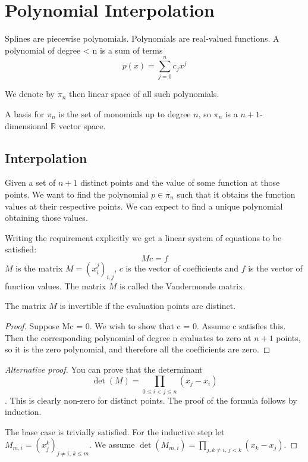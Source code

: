 
\chapter{Polynomial Interpolation}

Splines are piecewise polynomials.
Polynomials are real-valued functions.
A polynomial of degree < n is a sum of terms
\begin{equation*}
p(x) = \sum_{j=0}^n c_j x^j
\end{equation*}

We denote by $\pi_n$ then linear space of all such polynomials.

A basis for $\pi_n$ is the set of monomials up to degree $n$, so $\pi_n$ is a $n + 1$-dimensional $\mathbb R$ vector space.

\section{Interpolation}

Given a set of $n + 1$ distinct points and the value of some function at those points.
We want to find the polynomial $p\in\pi_n$ such that it obtains the function values at their respective points.
We can expect to find a unique polynomial obtaining those values.

Writing the requirement explicitly we get a linear system of equations to be satisfied:
\begin{equation*}
    Mc = f
\end{equation*}
$M$ is the matrix $M=(x_i^j)_{i,j}$, $c$ is the vector of coefficients and $f$ is the vector of function values.
The matrix $M$ is called the Vandermonde matrix. 

\begin{theorem}
    The matrix $M$ is invertible if the evaluation points are distinct.
\end{theorem}
\begin{proof}
    Suppose Mc = 0. We wish to show that c = 0.
    Assume c satisfies this.
    Then the corresponding polynomial of degree n evaluates to zero at $n + 1$ points,
    so it is the zero polynomial, and therefore all the coefficients are zero.
\end{proof}

\begin{proof}[Alternative proof]
    You can prove that the determinant
    \begin{equation*}
    \det(M)= \prod_{0\leq i < j \leq n} (x_j - x_i)
    \end{equation*}.
    This is clearly non-zero for distinct points.
    The proof of the formula follows by induction.

    The base case is trivially satisfied.
    For the inductive step let $M_{m,i} = (x_j^k)_{j\neq i,\, k\leq m}$.
    We assume $\det(M_{m,i})=\prod_{j,k\neq i,\, j<k} (x_k - x_j)$.
\end{proof}

